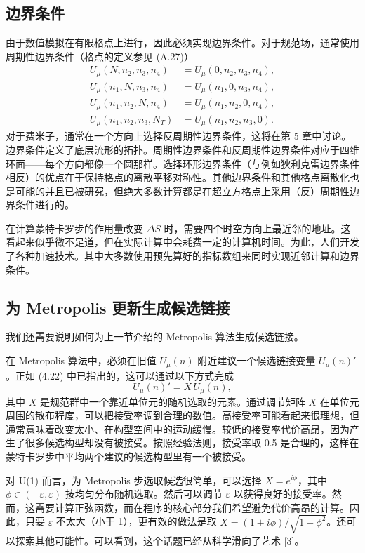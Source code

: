 \subsection{边界条件}

由于数值模拟在有限格点上进行，因此必须实现边界条件。对于规范场，通常使用周期性边界条件（格点的定义参见 (A.27)）
\begin{equation}
  \begin{split}
    U_\mu(N, n_2, n_3, n_4) &= U_\mu(0, n_2, n_3, n_4), \\
    U_\mu(n_1, N, n_3, n_4) &= U_\mu(n_1, 0, n_3, n_4), \\
    U_\mu(n_1, n_2, N, n_4) &= U_\mu(n_1, n_2, 0, n_4), \\
    U_\mu(n_1, n_2, n_3, N_T) &= U_\mu(n_1, n_2, n_3, 0).
  \end{split}
\end{equation}
对于费米子，通常在一个方向上选择反周期性边界条件，这将在第 5 章中讨论。边界条件定义了底层流形的拓扑。周期性边界条件和反周期性边界条件对应于四维环面——每个方向都像一个圆那样。选择环形边界条件（与例如狄利克雷边界条件相反）的优点在于保持格点的离散平移对称性。其他边界条件和其他格点离散化也是可能的并且已被研究，但绝大多数计算都是在超立方格点上采用（反）周期性边界条件进行的。

在计算蒙特卡罗步的作用量改变 $\Delta S$ 时，需要四个时空方向上最近邻的地址。这看起来似乎微不足道，但在实际计算中会耗费一定的计算机时间。为此，人们开发了各种加速技术。其中大多数使用预先算好的指标数组来同时实现近邻计算和边界条件。

\subsection{为 Metropolis 更新生成候选链接}

我们还需要说明如何为上一节介绍的 Metropolis 算法生成候选链接。

在 Metropolis 算法中，必须在旧值 $U_\mu(n)$ 附近建议一个候选链接变量 $U_\mu(n)'$。正如 (4.22) 中已指出的，这可以通过以下方式完成
\begin{equation}
  U_\mu(n)' = X\,U_\mu(n),
\end{equation}
其中 $X$ 是规范群中一个靠近单位元的随机选取的元素。通过调节矩阵 $X$ 在单位元周围的散布程度，可以把接受率调到合理的数值。高接受率可能看起来很理想，但通常意味着改变太小、在构型空间中的运动缓慢。较低的接受率代价高昂，因为产生了很多候选构型却没有被接受。按照经验法则，接受率取 0.5 是合理的，这样在蒙特卡罗步中平均两个建议的候选构型里有一个被接受。

对 U(1) 而言，为 Metropolis 步选取候选很简单，可以选择 $X = e^{i\phi}$，其中 $\phi \in (-\varepsilon, \varepsilon)$ 按均匀分布随机选取。然后可以调节 $\varepsilon$ 以获得良好的接受率。然而，这需要计算正弦函数，而在程序的核心部分我们希望避免代价高昂的计算。因此，只要 $\varepsilon$ 不太大（小于 1），更有效的做法是取 $X = (1 + i\phi)/\sqrt{1 + \phi^2}$。还可以探索其他可能性。可以看到，这个话题已经从科学滑向了艺术 [3]。

